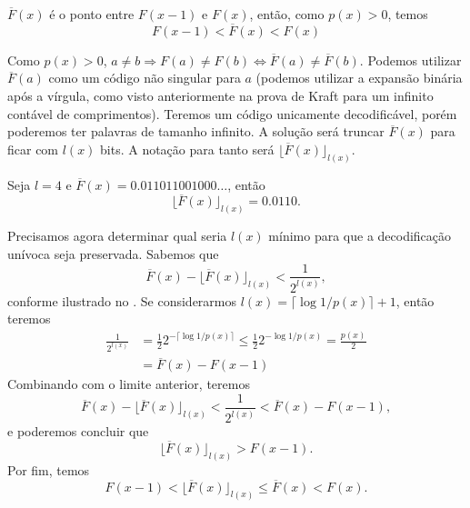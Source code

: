 $\overline{F}(x)$ é o ponto entre $F(x-1)$ e $F(x)$, então, como $p(x)>0$, temos
\begin{equation}
  F(x-1) < \overline{F}(x) < F(x)
\end{equation}

Como $p(x)>0$, $a \neq b \Rightarrow F(a) \neq F(b) \Leftrightarrow
\overline{F}(a) \neq \overline{F}(b)$.  Podemos utilizar $\overline{F}(a)$ como
um código não singular para $a$ (podemos utilizar a expansão binária após a
vírgula, como visto anteriormente na prova de Kraft para um infinito contável
de comprimentos).  Teremos um código unicamente decodificável, porém poderemos
ter palavras de tamanho infinito.  A solução será truncar $\overline{F}(x)$
para ficar com $l(x)$ bits. A notação para tanto será $\lfloor \overline{F}(x) \rfloor_{l(x)}$.

\begin{example}\label{ex:Fbarratruncado}
Seja $l=4$ e $\overline{F}(x) = 0.011011001000\ldots$, então
\begin{equation}
    \lfloor \overline{F}(x) \rfloor_{l(x)} = 0.0110 .
\end{equation}
\end{example}

Precisamos agora determinar qual seria $l(x)$ mínimo para que a decodificação unívoca seja preservada.
Sabemos que
\begin{equation}
 \overline{F}(x) - \lfloor \overline{F}(x) \rfloor_{l(x)} < \frac{1}{2^{l(x)}} ,
\end{equation}
conforme ilustrado no .
Se considerarmos $l(x) = \lceil \log 1/p(x) \rceil + 1$, então teremos
\begin{subequations}
\begin{align}
\frac{1}{2^{l(x)}} &= \frac{1}{2} 2^{- \lceil \log 1/p(x) \rceil} \leq \frac{1}{2} 2^{-\log 1/p(x)} = \frac{p(x)}{2} \\
                &= \overline{F}(x) - F(x-1)
\end{align}
\end{subequations}
Combinando com o limite anterior, teremos
\begin{equation}
 \overline{F}(x) - \lfloor \overline{F}(x) \rfloor_{l(x)} < \frac{1}{2^{l(x)}} < \overline{F}(x) - F(x-1) ,
\end{equation}
e poderemos concluir que
\begin{equation}
 \lfloor \overline{F}(x) \rfloor_{l(x)} > F(x-1) .
\end{equation}
Por fim, temos
\begin{equation}
 F(x-1) < \lfloor \overline{F}(x) \rfloor_{l(x)} \leq \overline{F}(x) < F(x) .
\end{equation}

